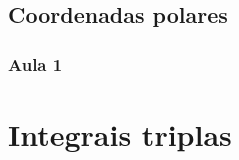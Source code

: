 \documentclass[
12pt,				%
openright,			%
twoside,			%
a4paper,			%
english,			%
french,				%
spanish,			%
brazil,				%
]{abntex2}
\begin{document}
\section{Coordenadas polares}		
	\subsection{Aula 1}
		
	

\chapter{Integrais triplas}\label{integrais_triplas}
	
	
	
	
	
	
\end{document}
